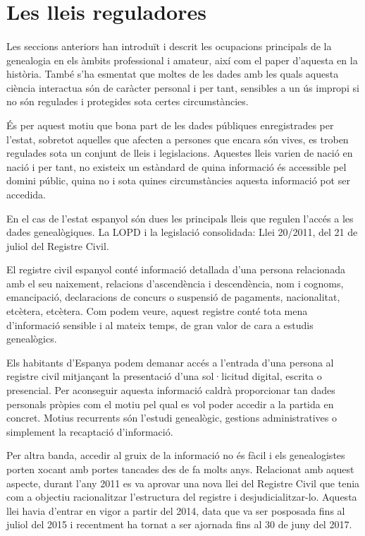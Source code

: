 \section{Les lleis reguladores}

    \paragraph{}
    Les seccions anteriors han introduït i descrit les ocupacions principals de la genealogia en els àmbits professional i amateur, així com el paper d'aquesta en la història. També s'ha esmentat que moltes de les dades amb les quals aquesta ciència interactua són de caràcter personal i per tant, sensibles a un ús impropi si no són regulades i protegides sota certes circumstàncies.

    És per aquest motiu que bona part de les dades públiques enregistrades per l’estat, sobretot aquelles que afecten a persones que encara són vives, es troben regulades sota un conjunt de lleis i legislacions. Aquestes lleis varien de nació en nació i per tant, no existeix un estàndard de quina informació és accessible pel domini públic, quina no i sota quines circumstàncies aquesta informació pot ser accedida.

    En el cas de l’estat espanyol són dues les principals lleis que regulen l’accés a les dades genealògiques. La \gls{LOPD} i la legislació consolidada: Llei 20/2011, del 21 de juliol del Registre Civil.

    El registre civil espanyol conté informació detallada d'una persona relacionada amb el seu naixement, relacions d’ascendència i descendència, nom i cognoms, emancipació, declaracions de concurs o suspensió de pagaments, nacionalitat, etcètera, etcètera.  Com podem veure, aquest registre conté tota mena d’informació sensible i al mateix temps, de gran valor de cara a estudis genealògics.

    Els habitants d'Espanya podem demanar accés a l'entrada d'una persona al registre civil mitjançant la presentació d'una sol·licitud digital, escrita o presencial. Per aconseguir aquesta informació caldrà proporcionar tan dades personals pròpies com el motiu pel qual es vol poder accedir a la partida en concret. Motius recurrents són l'estudi genealògic, gestions administratives o simplement la recaptació d'informació.

    Per altra banda, accedir al gruix de la informació no és fàcil i els genealogistes porten xocant amb portes tancades des de fa molts anys. Relacionat amb aquest aspecte, durant l'any 2011 es va aprovar una nova llei del Registre Civil que tenia com a objectiu racionalitzar l'estructura del registre i desjudicialitzar-lo. Aquesta llei havia d'entrar en vigor a partir del 2014, data que va ser posposada fins al juliol del 2015 i recentment ha tornat a ser ajornada fins al 30 de juny del 2017.

